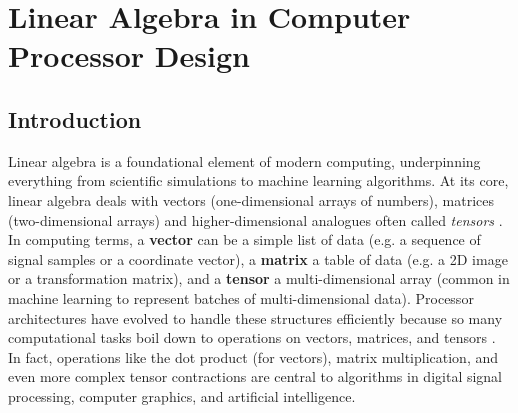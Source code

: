 \chapter{Linear Algebra in Computer Processor Design}

\section{Introduction}
Linear algebra is a foundational element of modern computing, underpinning everything from scientific simulations to machine learning algorithms. At its core, linear algebra deals with vectors (one-dimensional arrays of numbers), matrices (two-dimensional arrays) and higher-dimensional analogues often called \textit{tensors} \cite{golub2013matrix}. In computing terms, a \textbf{vector} can be a simple list of data (e.g. a sequence of signal samples or a coordinate vector), a \textbf{matrix} a table of data (e.g. a 2D image or a transformation matrix), and a \textbf{tensor} a multi-dimensional array (common in machine learning to represent batches of multi-dimensional data). Processor architectures have evolved to handle these structures efficiently because so many computational tasks boil down to operations on vectors, matrices, and tensors \cite{hennessy2019new}. In fact, operations like the dot product (for vectors), matrix multiplication, and even more complex tensor contractions are central to algorithms in digital signal processing, computer graphics, and artificial intelligence.


